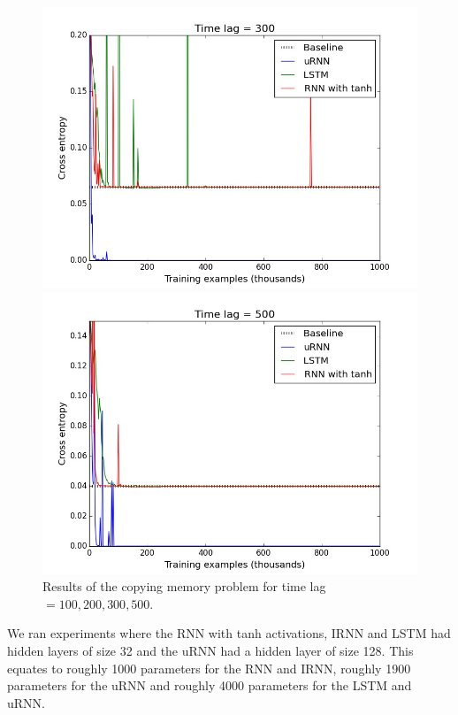 \documentclass{article} %
\begin{document}
\begin{figure}[t!]
\begin{minipage}[b]{0.5\linewidth}
    \includegraphics[scale=0.25]{figures/memory_300.jpeg}
  \end{minipage}%
  \begin{minipage}[b]{0.5\linewidth}
    \includegraphics[scale=0.25]{figures/memory_500.jpeg}
  \end{minipage} 
  \caption{Results of the copying memory problem for time lag $=100, 200, 300, 500$.}
\end{figure}

We ran experiments where the RNN with tanh activations, IRNN and LSTM had hidden layers of size 32 and the
uRNN had a hidden layer of size 128. This equates to roughly 1000 parameters for the RNN and IRNN, roughly 
1900 parameters for the uRNN and roughly 4000 parameters for the LSTM and uRNN.
\end{document}
